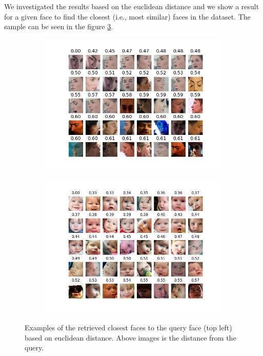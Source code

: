 We investigated the results based on the euclidean distance and we show a result for a given face to find the closest (i.e., most similar) faces in the dataset. The sample can be seen in the figure \ref{fig:closest_faces}.


\begin{figure}
    \centering
      \begin{subfigure}[b]{\textwidth}
        \centering
        \includegraphics[width=\linewidth]{img/closest_faces_to_woman.png}
        \caption{}
        \label{fig:my_label}
    \end{subfigure}
    
    \hfill

      \begin{subfigure}[b]{\textwidth}
        \centering
        \includegraphics[width=\linewidth]{img/kid_closest_faces.png}
        \caption{}
        \label{fig:my_label}
    \end{subfigure}
    
    \caption{Examples of the retrieved closest faces to the query face (top left) based on euclidean distance. Above images is the distance from the query.}
    \label{fig:closest_faces}
\end{figure}




